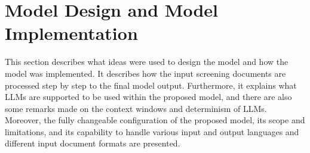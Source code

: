 \documentclass[draft,final]{thesisclass} %
\begin{document}
\section{Model Design and Model Implementation} \label{implementation}
This section describes what ideas were used to design the model and how the model was implemented.
It describes how the input screening documents are processed step by step to the final model output.
Furthermore, it explains what \acs{LLM}s are supported to be used within the proposed model, and there are also some remarks made on the context windows and determinism of \acs{LLM}s.
Moreover, the fully changeable configuration of the proposed model, its scope and limitations, and its capability to handle various input and output languages and different input document formats are presented.
\end{document}
